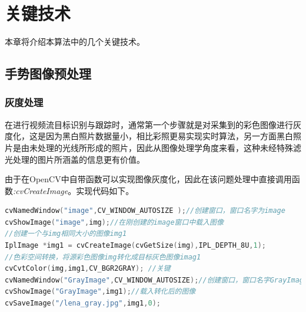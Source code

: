 \documentclass{XDBAthesis}
\begin{document}
\else
{}

\lstset{numbers=left,
extendedchars=false,
escapechar=@,style=customc
}
\fi

\chapter{关键技术}
本章将介绍本算法中的几个关键技术。


%

\section{手势图像预处理}

\subsection{灰度处理}

在进行视频流目标识别与跟踪时，通常第一个步骤就是对采集到的彩色图像进行灰度化\cite{黄柏林2002基于边界特征的人脸识别}，这是因为黑白照片数据量小，相比彩照更易实现实时算法，另一方面黑白照片是由未处理的光线所形成的照片，因此从图像处理学角度来看，这种未经特殊滤光处理的图片所涵盖的信息更有价值。

由于在OpenCV中自带函数可以实现图像灰度化，因此在该问题处理中直接调用函数\emph{:cvCreateImage}。实现代码如下。
\begin{lstlisting}[language=C]
cvNamedWindow("image",CV_WINDOW_AUTOSIZE );//创建窗口，窗口名字为image
cvShowImage("image",img);//在刚创建的image窗口中载入图像
//创建一个与img相同大小的图像img1
IplImage *img1 = cvCreateImage(cvGetSize(img),IPL_DEPTH_8U,1);
//色彩空间转换，将源彩色图像img转化成目标灰色图像imag1
cvCvtColor(img,img1,CV_BGR2GRAY); //关键
cvNamedWindow("GrayImage",CV_WINDOW_AUTOSIZE);//创建窗口，窗口名字GrayImage
cvShowImage("GrayImage",img1);//载入转化后的图像
cvSaveImage("/lena_gray.jpg",img1,0);
\end{lstlisting}
%
%
\end{document}

